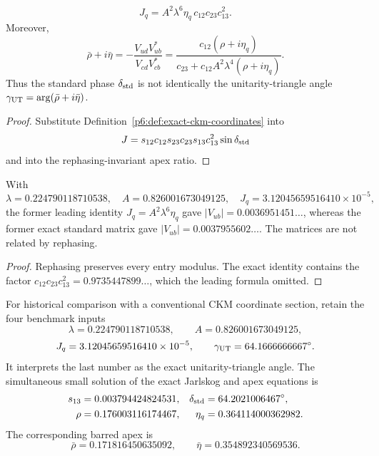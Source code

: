 \documentclass[11pt,a4paper]{article}
\begin{document}
\begin{theorem}
\label{p6:thm:exact-ckm-identities}
\[
\boxed{
J_q
=
A^2\lambda^6\eta_q\,c_{12}c_{23}c_{13}^2.
}
\]
Moreover,
\[
\bar\rho+i\bar\eta
=
-\frac{V_{ud}V_{ub}^*}{V_{cd}V_{cb}^*}
=
\frac{c_{12}(\rho+i\eta_q)}
{c_{23}+c_{12}A^2\lambda^4(\rho+i\eta_q)}.
\]
Thus the standard phase \(\delta_{\rm std}\) is not identically the
unitarity-triangle angle
\(\gamma_{\rm UT}=\arg(\bar\rho+i\bar\eta)\).
\end{theorem}

\begin{proof}
Substitute Definition~\ref{p6:def:exact-ckm-coordinates} into
\[
J=s_{12}c_{12}s_{23}c_{23}s_{13}c_{13}^2
\sin\delta_{\rm std}
\]
and into the rephasing-invariant apex ratio.
\end{proof}

\begin{theorem}
\label{p6:thm:former-ckm-inequivalence}
With
\[
\lambda=0.224790118710538,\quad
A=0.826001673049125,\quad
J_q=3.12045659516410\times10^{-5},
\]
the former leading identity
\(
J_q=A^2\lambda^6\eta_q
\)
gave \(|V_{ub}|=0.0036951451\ldots\), whereas the former exact standard
matrix gave \(|V_{ub}|=0.0037955602\ldots\).  The matrices are not related by
rephasing.
\end{theorem}

\begin{proof}
Rephasing preserves every entry modulus.  The exact identity contains the
factor
\(
c_{12}c_{23}c_{13}^2=0.9735447899\ldots
\),
which the leading formula omitted.
\end{proof}

\begin{definition}
\label{p6:def:selected-ckm-branch}
For historical comparison with a conventional CKM coordinate section, retain the four benchmark inputs
\[
\lambda=0.224790118710538,\qquad
A=0.826001673049125,
\]
\[
J_q=3.12045659516410\times10^{-5},
\qquad
\gamma_{\rm UT}=64.1666666667^\circ .
\]
It interprets the last number as the exact unitarity-triangle angle.  The
simultaneous small solution of the exact Jarlskog and apex equations is
\[
\begin{aligned}
s_{13}&=0.003794424824531,&
\delta_{\rm std}&=64.2021006467^\circ,\\
\rho&=0.176003116174467,&
\eta_q&=0.364114000362982.
\end{aligned}
\]
The corresponding barred apex is
\[
\bar\rho=0.171816450635092,
\qquad
\bar\eta=0.354892340569536.
\]
\end{definition}
\end{document}
